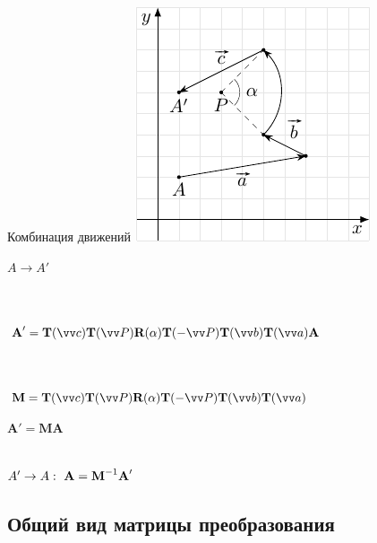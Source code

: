 \documentclass[10pt]{beamer}
\begin{document}
\begin{frame}{Комбинация движений}
	{
		\includegraphics{translate3.pdf}
	}
	{
		$A \rightarrow A' $ \\ ~ \\ \pause
		
		\hspace{1cm} \\[0.5em]
		$  \textbf{A}'=\textbf{T}(\vv c)\textbf{T}(\vv P)\textbf{R}(\alpha)\textbf{T}(-\vv P)\textbf{T}(\vv b)\textbf{T}(\vv a)\textbf{A}  $  \\[0.5em] 
		\hspace{1cm} 
		\\ ~ \\ \pause
		
		$ \textbf{M} = \textbf{T}(\vv c)\textbf{T}(\vv P)\textbf{R}(\alpha)\textbf{T}(-\vv P)\textbf{T}(\vv b)\textbf{T}(\vv a) $ 
		
		$\textbf{A}' = \textbf{M}\textbf{A}$ \\ ~ \\ \pause
		
		$A' \rightarrow A: \ \textbf{A}=\textbf{M}^{-1}\textbf A'$
		
		
	}


\end{frame}



\subsection{Общий вид матрицы преобразования}
\end{document}
